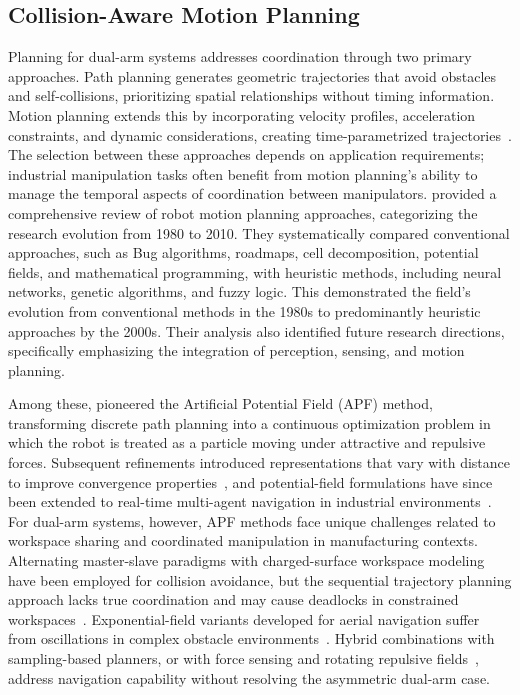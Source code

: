 \subsection{Collision-Aware Motion Planning}\label{subsec:intro_iapf}
Planning for dual-arm systems addresses coordination through two primary approaches. Path planning generates geometric trajectories that avoid obstacles and self-collisions, prioritizing spatial relationships without timing information. Motion planning extends this by incorporating velocity profiles, acceleration constraints, and dynamic considerations, creating time-parametrized trajectories~\citep{abbas2023systematic}. The selection between these approaches depends on application requirements; industrial manipulation tasks often benefit from motion planning's ability to manage the temporal aspects of coordination between manipulators. \citet{tang2012review} provided a comprehensive review of robot motion planning approaches, categorizing the research evolution from 1980 to 2010. They systematically compared conventional approaches, such as Bug algorithms, roadmaps, cell decomposition, potential fields, and mathematical programming, with heuristic methods, including neural networks, genetic algorithms, and fuzzy logic. This demonstrated the field's evolution from conventional methods in the 1980s to predominantly heuristic approaches by the 2000s. Their analysis also identified future research directions, specifically emphasizing the integration of perception, sensing, and motion planning.

Among these, \citet{khatib1986real} pioneered the Artificial Potential Field (APF) method,
transforming discrete path planning into a continuous optimization problem in which the robot is
treated as a particle moving under attractive and repulsive forces. Subsequent refinements
introduced representations that vary with distance to improve convergence
properties~\citep{volpe1987artificial}, and potential-field formulations have since been extended to
real-time multi-agent navigation in industrial environments~\citep{prajapati2026mppf}. For dual-arm
systems, however, APF methods face unique challenges related to workspace sharing and coordinated
manipulation in manufacturing contexts. Alternating master-slave paradigms with charged-surface
workspace modeling have been employed for collision avoidance, but the sequential trajectory
planning approach lacks true coordination and may cause deadlocks in constrained
workspaces~\citep{chuang2006priority}. Exponential-field variants developed for aerial navigation
suffer from oscillations in complex obstacle environments~\citep{jayaweera2020dapf}. Hybrid
combinations with sampling-based planners, or with force sensing and rotating repulsive
fields~\citep{lin2025rotating}, address navigation capability without resolving the asymmetric
dual-arm case.

